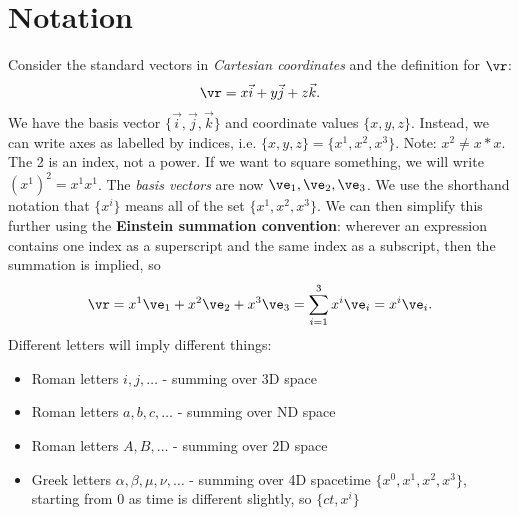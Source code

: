 \documentclass[a4paper, 11pt, normalem]{report}
\begin{document}
\section{Notation}

Consider the standard vectors in \emph{Cartesian coordinates} and the definition for $\vr$:
\begin{align}
    \vr = x\vec{i} + y\vec{j} + z\vec{k}.
\end{align}
We have the basis vector $\{\vec{i},\vec{j},\vec{k}\}$ and coordinate values $\{x,y,z\}$.
Instead, we can write axes as labelled by indices, i.e. $\{x,y,z\}=\{x^1,x^2,x^3\}$.
Note: $x^2 \neq x*x$.
The 2 is an index, not a power.
If we want to square something, we will write $(x^1)^2 = x^1x^1$.
The \emph{basis vectors} are now $\ve_1,\ve_2,\ve_3$.
We use the shorthand notation that $\{x^i\}$ means all of the set $\{x^1,x^2,x^3\}$.
We can then simplify this further using the \textbf{Einstein summation convention}: wherever an expression contains one index as a superscript and the same index as a subscript, then the summation is implied, so
\begin{align}
    \vr = x^1\ve_1+x^2\ve_2+x^3\ve_3 = \sum_{i=1}^3 x^i\ve_i = x^i\ve_i.
\end{align}
Different letters will imply different things:
\begin{itemize}
    \item Roman letters $i,j,\dots$ - summing over 3D space
    \item Roman letters $a,b,c,\dots$ - summing over ND space
    \item Roman letters $A,B,\dots$ - summing over 2D space
    \item Greek letters $\alpha,\beta,\mu,\nu,\dots$ - summing over 4D spacetime $\{x^0,x^1,x^2,x^3\}$, starting from 0 as time is different slightly, so $\{ct,x^i\}$
\end{itemize}
\end{document}
